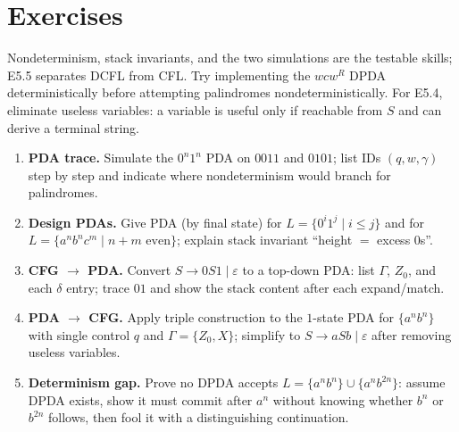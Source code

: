 \section{Exercises}
\label{sec:ch05-exercises}
Nondeterminism, stack invariants, and the two simulations are the testable skills; E5.5 separates DCFL from CFL.
Try implementing the $wcw^R$ DPDA deterministically before attempting palindromes nondeterministically.
For E5.4, eliminate useless variables: a variable is useful only if reachable from $S$ and can derive a terminal string.
\begin{enumerate}[label=E5.\arabic*, leftmargin=*, itemsep=0.8em]
\item \textbf{PDA trace.} Simulate the $0^n1^n$ PDA on $0011$ and $0101$; list IDs $(q,w,\gamma)$ step by step and indicate where nondeterminism would branch for palindromes.
\item \textbf{Design PDAs.} Give PDA (by final state) for $L=\{0^i1^j\mid i\le j\}$ and for $L=\{a^nb^nc^m\mid n+m\text{ even}\}$; explain stack invariant ``height $=$ excess $0$s''.
\item \textbf{CFG $\to$ PDA.} Convert $S\to0S1\mid\varepsilon$ to a top-down PDA: list $\Gamma$, $Z_0$, and each $\delta$ entry; trace $01$ and show the stack content after each expand/match.
\item \textbf{PDA $\to$ CFG.} Apply triple construction to the $1$-state PDA for $\{a^n b^n\}$ with single control $q$ and $\Gamma=\{Z_0,X\}$; simplify to $S\to aSb\mid\varepsilon$ after removing useless variables.
\item \textbf{Determinism gap.} Prove no DPDA accepts $L=\{a^nb^n\}\cup\{a^nb^{2n}\}$: assume DPDA exists, show it must commit after $a^n$ without knowing whether $b^n$ or $b^{2n}$ follows, then fool it with a distinguishing continuation.
\end{enumerate}
